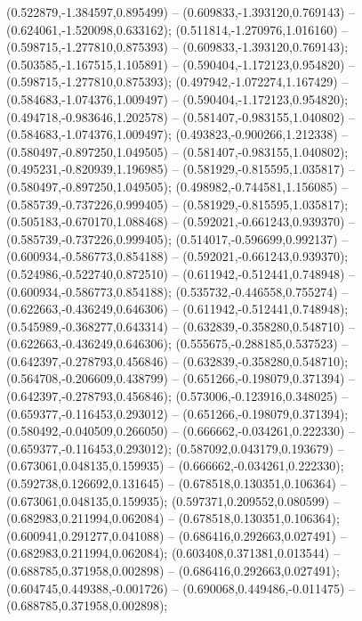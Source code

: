  (0.522879,-1.384597,0.895499) -- (0.609833,-1.393120,0.769143) -- (0.624061,-1.520098,0.633162);
 (0.511814,-1.270976,1.016160) -- (0.598715,-1.277810,0.875393) -- (0.609833,-1.393120,0.769143);
 (0.503585,-1.167515,1.105891) -- (0.590404,-1.172123,0.954820) -- (0.598715,-1.277810,0.875393);
 (0.497942,-1.072274,1.167429) -- (0.584683,-1.074376,1.009497) -- (0.590404,-1.172123,0.954820);
 (0.494718,-0.983646,1.202578) -- (0.581407,-0.983155,1.040802) -- (0.584683,-1.074376,1.009497);
 (0.493823,-0.900266,1.212338) -- (0.580497,-0.897250,1.049505) -- (0.581407,-0.983155,1.040802);
 (0.495231,-0.820939,1.196985) -- (0.581929,-0.815595,1.035817) -- (0.580497,-0.897250,1.049505);
 (0.498982,-0.744581,1.156085) -- (0.585739,-0.737226,0.999405) -- (0.581929,-0.815595,1.035817);
 (0.505183,-0.670170,1.088468) -- (0.592021,-0.661243,0.939370) -- (0.585739,-0.737226,0.999405);
 (0.514017,-0.596699,0.992137) -- (0.600934,-0.586773,0.854188) -- (0.592021,-0.661243,0.939370);
 (0.524986,-0.522740,0.872510) -- (0.611942,-0.512441,0.748948) -- (0.600934,-0.586773,0.854188);
 (0.535732,-0.446558,0.755274) -- (0.622663,-0.436249,0.646306) -- (0.611942,-0.512441,0.748948);
 (0.545989,-0.368277,0.643314) -- (0.632839,-0.358280,0.548710) -- (0.622663,-0.436249,0.646306);
 (0.555675,-0.288185,0.537523) -- (0.642397,-0.278793,0.456846) -- (0.632839,-0.358280,0.548710);
 (0.564708,-0.206609,0.438799) -- (0.651266,-0.198079,0.371394) -- (0.642397,-0.278793,0.456846);
 (0.573006,-0.123916,0.348025) -- (0.659377,-0.116453,0.293012) -- (0.651266,-0.198079,0.371394);
 (0.580492,-0.040509,0.266050) -- (0.666662,-0.034261,0.222330) -- (0.659377,-0.116453,0.293012);
 (0.587092,0.043179,0.193679) -- (0.673061,0.048135,0.159935) -- (0.666662,-0.034261,0.222330);
 (0.592738,0.126692,0.131645) -- (0.678518,0.130351,0.106364) -- (0.673061,0.048135,0.159935);
 (0.597371,0.209552,0.080599) -- (0.682983,0.211994,0.062084) -- (0.678518,0.130351,0.106364);
 (0.600941,0.291277,0.041088) -- (0.686416,0.292663,0.027491) -- (0.682983,0.211994,0.062084);
 (0.603408,0.371381,0.013544) -- (0.688785,0.371958,0.002898) -- (0.686416,0.292663,0.027491);
 (0.604745,0.449388,-0.001726) -- (0.690068,0.449486,-0.011475) -- (0.688785,0.371958,0.002898);
